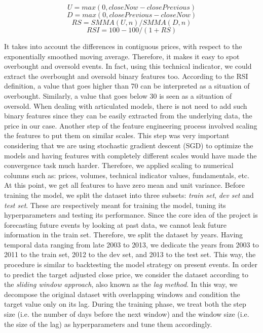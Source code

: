 \documentclass{article}
\begin{document}
$$
U = max(0, closeNow - closePrevious)
$$
$$
D = max(0, closePrevious - closeNow)
$$
$$
RS = SMMA(U,n)/SMMA(D,n)
$$
$$
RSI = 100 - 100/(1+RS)
$$

It takes into account the differences in contiguous prices, with respect to the
exponentially smoothed moving average. Therefore, it makes it easy to spot overbought
and oversold events. In fact, using this technical indicator, we could extract the
overbought and oversold binary features too. According to the RSI definition,
a value that goes higher than 70 can be interpreted as a situation of overbought.
Similarly, a value that goes below 30 is seen as a situation of oversold. 
When dealing with articulated models, there is not need to add such binary features
since they can be easily extracted from the underlying data, the price in our case.
Another step of the feature engineering process involved scaling the features to put them
on similar scales. This step was very important considering that we are using stochastic gradient
descent (SGD) to optimize the models and having features with completely different scales would
have made the convergence task much harder. Therefore, we applied scaling to numerical columns such as: prices,
volumes, technical indicator values, fundamentals, etc. At this point, we get all features
to have zero mean and unit variance.
Before training the model, we split the dataset into three subsets: \emph{train set},
\emph{dev set} and \emph{test set}. These are respectively meant for training the model,
tuning its hyperparameters and testing its performance. Since the core idea of the project
is forecasting future events by looking at past data, we cannot leak future information in
the train set. Therefore, we split the dataset by years. Having temporal data ranging from
late 2003 to 2013, we dedicate the years from 2003 to 2011 to the train set, 2012 to the dev set, and
2013 to the test set. This way, the procedure is similar to backtesting the model strategy
on present events.
In order to predict the target adjusted close price, we consider the dataset according to the \emph{sliding window approach}, also known as the \emph{lag method}. In this way, we decompose the original dataset with overlapping windows and condition the target value only on its lag. During the training phase, we treat both the step size (i.e. the number of days before the next window) and the window size (i.e. the size of the lag) as hyperparameters and tune them accordingly.

\end{document}
